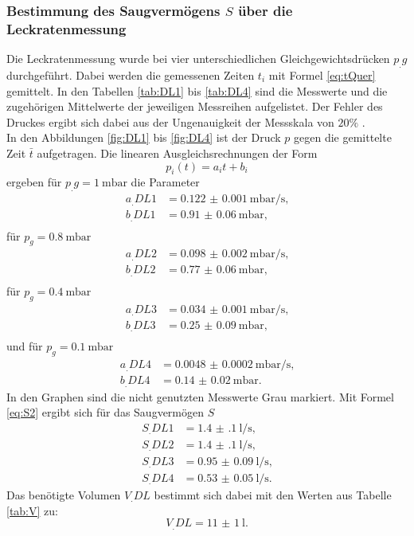 \subsubsection{Bestimmung des Saugvermögens $S$ über die Leckratenmessung}

Die Leckratenmessung wurde bei vier unterschiedlichen Gleichgewichtsdrücken $p_.g$ durchgeführt. Dabei werden die gemessenen Zeiten $t_i$ mit Formel \eqref{eq:tQuer} gemittelt.
In den Tabellen \ref{tab:DL1} bis \ref{tab:DL4} sind die Messwerte und die zugehörigen Mittelwerte der jeweiligen Messreihen aufgelistet. Der Fehler des Druckes ergibt sich dabei aus der Ungenauigkeit der Messskala von $20\%$ \cite{V70}.\\
In den Abbildungen \ref{fig:DL1} bis \ref{fig:DL4} ist der Druck $p$ gegen die gemittelte Zeit $\bar{t}$ aufgetragen.
Die linearen Ausgleichsrechnungen der Form
\[
p_i(t) = a_it+b_i
\]
ergeben für $p_.g = \SI{1}{\milli\bar}$ die Parameter
\begin{align*}
a_.{DL1} &= \SI{0.122(1)}{\milli\bar\per\second} \text{,}\\
b_.{DL1} &= \SI{0.91(6)}{\milli\bar} \text{,}\\
\end{align*}
für $p_g = \SI{0.8}{\milli\bar}$
\begin{align*}
a_.{DL2} &= \SI{0.098(2)}{\milli\bar\per\second} \text{,}\\
b_.{DL2} &= \SI{0.77(6)}{\milli\bar} \text{,}\\
\end{align*}
für $p_g = \SI{0.4}{\milli\bar}$
\begin{align*}
a_.{DL3} &= \SI{0.034(1)}{\milli\bar\per\second} \text{,}\\
b_.{DL3} &= \SI{0.25(9)}{\milli\bar} \text{,}\\
\end{align*}
und für $p_g = \SI{0.1}{\milli\bar}$
\begin{align*}
a_.{DL4} &= \SI{0.0048(2)}{\milli\bar\per\second} \text{,}\\
b_.{DL4} &= \SI{0.14(2)}{\milli\bar} \text{.}
\end{align*}
In den Graphen sind die nicht genutzten Messwerte Grau markiert.
Mit Formel \eqref{eq:S2} ergibt sich für das Saugvermögen $S$
\begin{align*}
S_.{DL1} &= \SI{1.4(1)}{\litre\per\second} \text{,}\\
S_.{DL2} &= \SI{1.4(1)}{\litre\per\second} \text{,}\\
S_.{DL3} &= \SI{0.95(9)}{\litre\per\second} \text{,}\\
S_.{DL4}   &= \SI{0.53(5)}{\litre\per\second} \text{.}
\end{align*}
Das benötigte Volumen $V_.{DL}$ bestimmt sich dabei mit den Werten aus Tabelle \ref{tab:V} zu:
\[
V_.{DL} = \SI{11(1)}{\litre}\text{.}
\]

